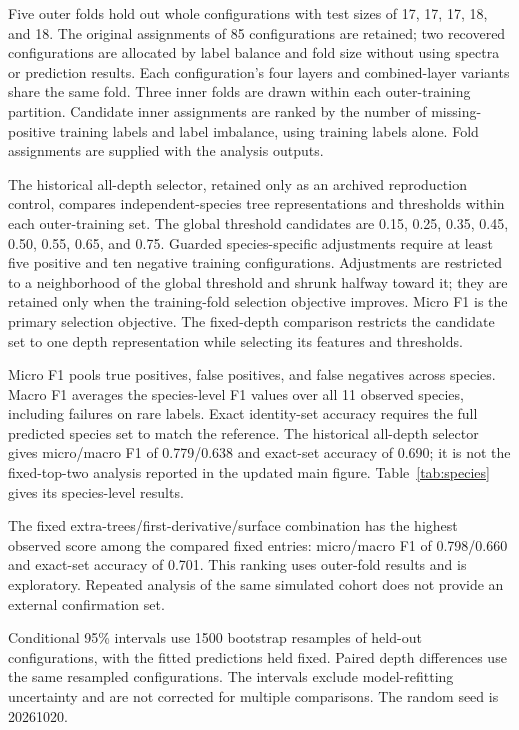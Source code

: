 \documentclass[11pt,a4paper]{article}
\begin{document}
Five outer folds hold out whole configurations with test sizes of 17, 17, 17, 18, and 18. The original assignments of 85 configurations are retained; two recovered configurations are allocated by label balance and fold size without using spectra or prediction results. Each configuration's four layers and combined-layer variants share the same fold. Three inner folds are drawn within each outer-training partition. Candidate inner assignments are ranked by the number of missing-positive training labels and label imbalance, using training labels alone. Fold assignments are supplied with the analysis outputs.

The historical all-depth selector, retained only as an archived reproduction control, compares independent-species tree representations and thresholds within each outer-training set. The global threshold candidates are 0.15, 0.25, 0.35, 0.45, 0.50, 0.55, 0.65, and 0.75. Guarded species-specific adjustments require at least five positive and ten negative training configurations. Adjustments are restricted to a neighborhood of the global threshold and shrunk halfway toward it; they are retained only when the training-fold selection objective improves. Micro F1 is the primary selection objective. The fixed-depth comparison restricts the candidate set to one depth representation while selecting its features and thresholds.

Micro F1 pools true positives, false positives, and false negatives across species. Macro F1 averages the species-level F1 values over all 11 observed species, including failures on rare labels. Exact identity-set accuracy requires the full predicted species set to match the reference. The historical all-depth selector gives micro/macro F1 of 0.779/0.638 and exact-set accuracy of 0.690; it is not the fixed-top-two analysis reported in the updated main figure. Table~\ref{tab:species} gives its species-level results.



The fixed extra-trees/first-derivative/surface combination has the highest observed score among the compared fixed entries: micro/macro F1 of 0.798/0.660 and exact-set accuracy of 0.701. This ranking uses outer-fold results and is exploratory. Repeated analysis of the same simulated cohort does not provide an external confirmation set.

Conditional 95\% intervals use 1500 bootstrap resamples of held-out configurations, with the fitted predictions held fixed. Paired depth differences use the same resampled configurations. The intervals exclude model-refitting uncertainty and are not corrected for multiple comparisons. The random seed is 20261020.
\end{document}
